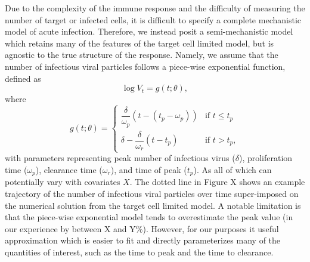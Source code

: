 \documentclass[11pt]{article}
\begin{document}
Due to the complexity of the immune response and the difficulty of measuring the number of target or infected cells, it is difficult to specify a complete mechanistic model of acute infection. Therefore, we instead posit a semi-mechanistic model which retains many of the features of the target cell limited model, but is agnostic to the true structure of the response. Namely, we assume that the number of infectious viral particles follows a piece-wise exponential function, defined as
\begin{equation*}
    \log V_t = g(t; \theta),
\end{equation*}
where
\begin{equation*}
    g(t; \theta) = \begin{cases}
   \dfrac{\delta}{\omega_p} (t - (t_p - \omega_p)) & \text{if } t \leq t_p \\
    \delta - \dfrac{\delta}{\omega_r} (t - t_p) & \text{if } t > t_p,
\end{cases}
\end{equation*}
with parameters representing peak number of infectious virus ($\delta$), proliferation time ($\omega_p$), clearance time ($\omega_r$), and time of peak ($t_p$). As all of which can potentially vary with covariates $X$. The dotted line in Figure X shows an example trajectory of the number of infectious viral particles over time super-imposed on the numerical solution from the target cell limited model. A notable limitation is that the piece-wise exponential model tends to overestimate the peak value (in our experience by between X and Y\%). However, for our purposes it useful approximation which is easier to fit and directly parameterizes many of the quantities of interest, such as the time to peak and the time to clearance.
\end{document}
